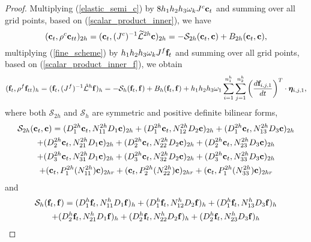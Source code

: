  \begin{proof}
 Multiplying (\ref{elastic_semi_c}) by $8h_1h_2h_3\omega_kJ^{c}{\bf c}_t$ and summing over all grid points, based on (\ref{scalar_product_inner}), we have
\begin{equation*}\label{coarse_simple}
({\bf c}_t, {\rho}^{c}{\bf c}_{tt})_{2h} = ({\bf c}_t,({J^c})^{-1}\wt{\mathcal{L}}^{2h}{\bf c})_{2h} = -\mathcal{S}_{2h}({\bf c}_t,{\bf c}) + B_{2h}({\bf c}_t,{{\bf c}}),
\end{equation*}
multiplying (\ref{fine_scheme}) by $h_1h_2h_3\omega_kJ^f{\bf f}_t$ and summing over all grid points, based on (\ref{scalar_product_inner_f}), we obtain
\begin{equation*}
({\bf f}_t, {\rho}^f{\bf f}_{tt})_h = ({\bf f}_t,({J^f})^{-1}\hat{\mathcal{L}}^h{\bf f})_h = -\mathcal{S}_{h}({\bf f}_t,{\bf f}) + B_h({\bf f}_t,{\bf f}) 
+h_1h_2h_3\omega_1\sum_{i = 1}^{n_1^h}\sum_{j=1}^{n_2^h} \left(\frac{d{\bf f}_{i,j,1}}{dt}\right)^T\cdot{\bm \eta}_{i,j,1},
\end{equation*}
where  both $\mathcal{S}_{2h}$ and $\mathcal{S}_{h}$ are symmetric and positive definite bilinear forms, 
\begin{multline*}
\mathcal{S}_{2h}({\bf c}_t,{\bf c}) = ({D}_1^{2h}{\bf c}_t,{N}_{11}^{2h}{D}_1{\bf c})_{2h} +  ({D}_1^{2h}{\bf c}_t,{N}_{12}^{2h}{D}_2{\bf c})_{2h} +  ({D}_1^{2h}{\bf c}_t,{N}_{13}^{2h}{D}_3{\bf c})_{2h}\\
 +  ({D}_2^{2h}{\bf c}_t,{N}_{21}^{2h}{D}_1{\bf c})_{2h} 
+  ({D}_2^{2h}{\bf c}_t,{N}_{22}^{2h}{D}_2{\bf c})_{2h} +  ({D}_2^{2h}{\bf c}_t,{N}_{23}^{2h}{D}_3{\bf c})_{2h} \\
+  ({D}_3^{2h}{\bf c}_t,{N}_{31}^{2h}{D}_1{\bf c})_{2h} 
+  ({D}_3^{2h}{\bf c}_t,{N}_{32}^{2h}{D}_2{\bf c})_{2h} +  ({D}_3^{2h}{\bf c}_t,{N}_{33}^{2h}{D}_3{\bf c})_{2h}\\
+ ({\bf c}_t, P^{2h}_1(N_{11}^{2h}){\bf c})_{2hr} + ({\bf c}_t, P^{2h}_2(N_{22}^{2h}){\bf c})_{2hr} + ({\bf c}_t, P^{2h}_1(N_{33}^{2h}){\bf c})_{2hr}
\end{multline*}
and 
\begin{multline*}
\mathcal{S}_{h}({\bf f}_t,{\bf f}) = ({D}_1^{h}{\bf f}_t,{N}_{11}^{h}{D}_1{\bf f})_{h} +  ({D}_1^{h}{\bf f}_t,{N}_{12}^{h}{D}_2{\bf f})_{h} +  ({D}_1^{h}{\bf f}_t,{N}_{13}^{h}{D}_3{\bf f})_{h}\\
+  ({D}_2^{h}{\bf f}_t,{N}_{21}^{h}{D}_1{\bf f})_{h} 
+  ({D}_2^{h}{\bf f}_t,{N}_{22}^{h}{D}_2{\bf f})_{h} +  ({D}_2^{h}{\bf f}_t,{N}_{23}^{h}{D}_3{\bf f})_{h} \\

\end{multline*}
\end{proof}

